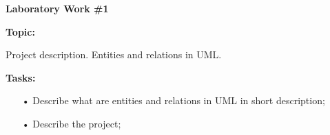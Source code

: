 \graphicspath{ {pic/} }
\begin{flushleft}
\setlength{\parindent}{2ex}\par
\textbf{Laboratory Work \#1} \par
\textbf{Topic:}\par
Project description. Entities and relations in UML.\par
\textbf{Tasks:}
\begin{enumerate}
\item[•] Describe  what are entities and relations in UML in short description;
\item[•] Describe the project;
\end{enumerate}
\end{flushleft}
\clearpage